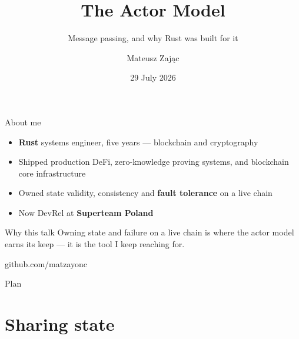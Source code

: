 

\usepackage[utf8]{inputenc}
\usepackage[T1]{fontenc}


\title{The Actor Model}
\subtitle{Message passing, and why Rust was built for it}
\author{Mateusz Zając}
\date{29 July 2026}



\maketitleframe

\begin{frame}{About me}
  \begin{itemize}
    \item \textbf{Rust} systems engineer, five years --- blockchain and cryptography
    \item Shipped production DeFi, zero-knowledge proving systems, and blockchain core infrastructure
    \item Owned state validity, consistency and \textbf{fault tolerance} on a live chain
    \item Now DevRel at \textbf{Superteam Poland}
  \end{itemize}
  \vspace{0.2cm}
  \begin{block}{Why this talk}
    Owning state and failure on a live chain is where the actor model earns its
    keep --- it is the tool I keep reaching for.
  \end{block}
  \vspace{0.1cm}
  \begin{center}
    \textcolor{stplmuted}{\small github.com/matzayonc}
  \end{center}
\end{frame}

\begin{frame}{Plan}
  \tableofcontents
\end{frame}

\section{Sharing state}

